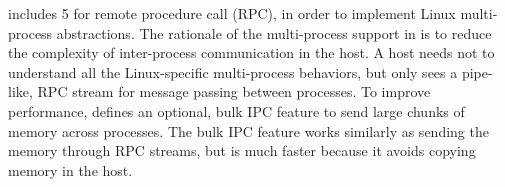 


\Thehostabi{} includes 5 \hostapis{} for 
remote procedure call (RPC),
in order to implement Linux multi-process abstractions.
The rationale of the multi-process support in \graphene{} is to reduce the complexity of inter-process communication in the host.
A host needs not to understand all the Linux-specific multi-process behaviors,
but only sees a pipe-like, RPC stream for message passing between processes.
To improve performance,
\thehostabi{} defines an optional, bulk IPC feature
to send large chunks of memory across processes.
The bulk IPC feature works similarly as sending the memory through RPC streams,
but is much faster because it avoids copying memory in the host.





